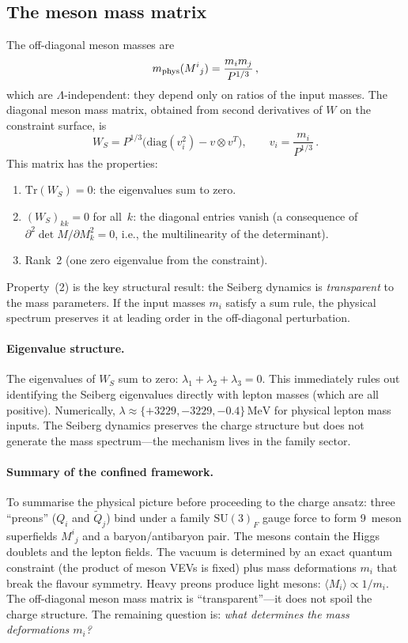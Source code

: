 \documentclass[12pt,a4paper]{article}
\makeatletter
\newcommand{\SU}{\mathrm{SU}}
\newcommand{\Tr}{\mathrm{Tr}}
\newcommand{\diag}{\mathrm{diag}}
\newcommand{\MeV}{\,\mathrm{MeV}}
\newcommand{\ie}{i.e.\@}
\makeatother
\begin{document}
\subsection{The meson mass matrix}

The off-diagonal meson masses are
\begin{equation}
  m_{\rm phys}(M^i{}_j) = \frac{m_i m_j}{P^{1/3}}\,,
  \label{eq:offdiag}
\end{equation}
which are $\Lambda$-independent: they depend only on ratios of the
input masses. The diagonal meson mass matrix, obtained from second
derivatives of $W$ on the constraint surface, is
\begin{equation}
  W_S = P^{1/3}\bigl(\diag(v_i^2) - v \otimes v^T\bigr),
  \qquad v_i = \frac{m_i}{P^{1/3}}\,.
  \label{eq:WS}
\end{equation}
This matrix has the properties:
\begin{enumerate}
  \item $\Tr(W_S) = 0$: the eigenvalues sum to zero.
  \item $(W_S)_{kk} = 0$ for all~$k$: the diagonal entries vanish
    (a consequence of $\partial^2 \det M / \partial M_k^2 = 0$, \ie,
    the multilinearity of the determinant).
  \item Rank~2 (one zero eigenvalue from the constraint).
\end{enumerate}
Property~(2) is the key structural result: the Seiberg dynamics is
\emph{transparent} to the mass parameters. If the input masses $m_i$
satisfy a sum rule, the physical spectrum preserves it at leading order
in the off-diagonal perturbation.

\paragraph{Eigenvalue structure.}
The eigenvalues of $W_S$ sum to zero: $\lambda_1 + \lambda_2 +
\lambda_3 = 0$. This immediately rules out identifying the Seiberg
eigenvalues directly with lepton masses (which are all positive).
Numerically, $\lambda \approx \{+3229, -3229, -0.4\}\MeV$ for
physical lepton mass inputs. The Seiberg dynamics preserves the charge
structure but does not generate the mass spectrum---the mechanism lives
in the family sector.

\paragraph{Summary of the confined framework.}
To summarise the physical picture before proceeding to the charge
ansatz: three ``preons'' ($Q_i$ and $\tilde Q_j$) bind under
a family $\SU(3)_F$ gauge force to form 9~meson superfields
$M^i{}_j$ and a baryon/antibaryon pair. The mesons contain the
Higgs doublets and the lepton fields. The vacuum is determined by
an exact quantum constraint (the product of meson VEVs is fixed)
plus mass deformations $m_i$ that break the flavour symmetry.
Heavy preons produce light mesons: $\langle M_i\rangle \propto
1/m_i$. The off-diagonal meson mass matrix is ``transparent''---it
does not spoil the charge structure. The remaining question is:
\emph{what determines the mass deformations $m_i$?}
\end{document}
